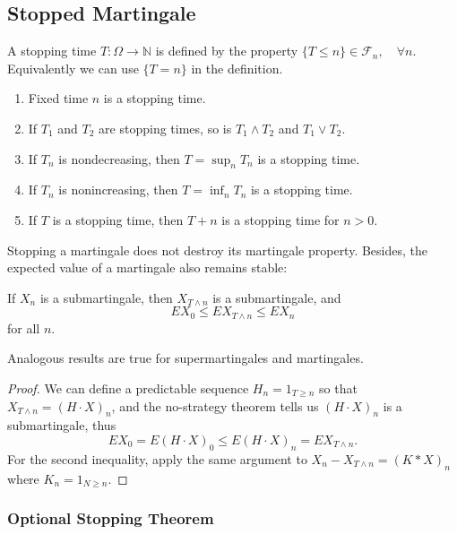 \subsection{Stopped Martingale}

\begin{definition}
	A stopping time $T: \Omega \to \mathbb{N}$ is defined by the property
	$\{T \le n\} \in \mathcal{F}_n, \quad \forall n$.
	Equivalently we can use $\{T = n\} $ in the definition.
\end{definition}

\begin{proposition}
	\begin{enumerate}
		\item 
	Fixed time $n$ is a stopping time.
\item If $T_1$ and $T_2$ are stopping times, so is $T_1 \wedge T_2$ and $T_1 \vee T_2$.
\item If $T_n$ is nondecreasing, then $T = \sup _n T_n$ is a stopping time.
\item If $T_n$ is nonincreasing, then $T = \inf _n T_n$ is a stopping time.
\item If $T$ is a stopping time, then $T + n$ is a stopping time for $n > 0$.
	\end{enumerate}
\end{proposition}

Stopping a martingale does not destroy its martingale property. Besides, the expected value of a martingale also remains stable:
\begin{theorem}
	\label{thm:EXTn}
	If $X_n$ is a submartingale, then $X_{T \wedge n}$ is a submartingale, and 
	\[
		E X_0 \le  E X_{T \wedge n}  \le  E X_n
	\]
	for all $n$. 

	Analogous results are true for supermartingales and martingales.
\end{theorem}
\begin{proof}
	We can define a predictable sequence $H_n = 1_{T \ge n}$ so that 
	$X_{T \wedge n} = \left( H \cdot X \right) _n$,
	and the no-strategy theorem tells us $(H \cdot X)_n$ is a submartingale, thus
	\[
		E X_0 = E (H \cdot X)_0 \le E(H \cdot X)_n = E X_{T \wedge n}
	.\] 
	For the second inequality, apply the same argument to $X_n - X_{T \wedge n} = (K * X)_n$ where $K_n = 1_{N \ge n}$.
\end{proof}


\subsubsection{Optional Stopping Theorem}

